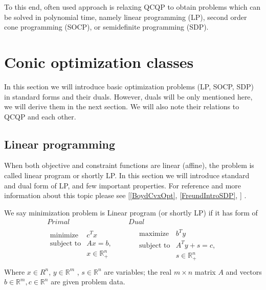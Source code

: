 \documentclass[10pt,oneside]{book}
\theoremstyle{definition}
\begin{document}
To this end, often used approach is relaxing QCQP to obtain problems which can be solved in polynomial time, namely linear programming (LP), second order cone programming  (SOCP), or semidefinite programming (SDP). 

\section{Conic optimization classes}

In this section we will introduce basic optimization problems (LP, SOCP, SDP) in standard forms and their duals.
However, duals will be only mentioned here, we will derive them in the next section. 
We will also note their relations to QCQP and each other.













\subsection{Linear programming}

When both objective and constraint functions are linear (affine), the problem is called linear program or shortly LP.
In this section we will introduce standard and dual form of LP, and few important properties. For reference and more information about this topic please see [\ref{BoydCvxOpt}, \ref{FreundIntroSDP},  ] .

\label{defLP}
We say minimization problem is Linear program (or shortly LP) if it has form of 
\begin{equation}
\label{LP} 
\begin{array}{c|c}
Primal & Dual \\
\begin{array}{ll}
\mbox{minimize} & c^Tx \\
\mbox{subject to}& Ax = b ,  \\
& x \in \mathbb{R}^n_+\\

\end{array} 
\ \ \ \ \ & \ \ \ \ \ 
\begin{array}{ll}
\mbox{maximize} & b^Ty \\
\mbox{subject to}& A^Ty +s = c ,  \\
& s\in \mathbb{R}^n_+ \\
\end{array}
\end{array} 
\tag{LP}
\end{equation}
Where $x\in R^n$, $y\in \mathbb{R}^m$ , $s\in \mathbb{R}^n$ are variables; the real $m\times n$ matrix $A$ and vectors $b \in \mathbb{R}^m, c\in \mathbb{R}^n$ are given problem data.
\end{document}
